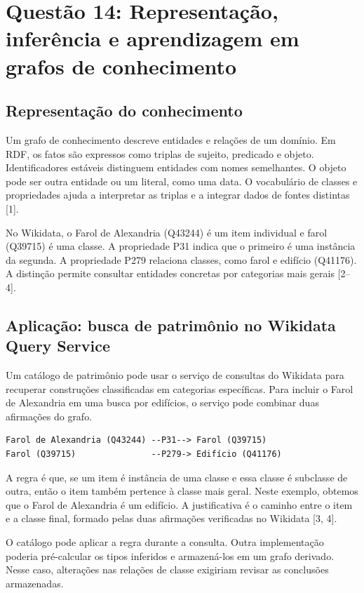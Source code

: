 \documentclass[12pt,a4paper]{article}
\begin{document}
\section{Questão 14: Representação, inferência e aprendizagem em grafos de conhecimento}

\subsection{Representação do conhecimento}

Um grafo de conhecimento descreve entidades e relações de um domínio. Em RDF, os fatos são expressos como triplas de sujeito, predicado e objeto. Identificadores estáveis distinguem entidades com nomes semelhantes. O objeto pode ser outra entidade ou um literal, como uma data. O vocabulário de classes e propriedades ajuda a interpretar as triplas e a integrar dados de fontes distintas [1].

No Wikidata, o Farol de Alexandria (Q43244) é um item individual e farol (Q39715) é uma classe. A propriedade P31 indica que o primeiro é uma instância da segunda. A propriedade P279 relaciona classes, como farol e edifício (Q41176). A distinção permite consultar entidades concretas por categorias mais gerais [2--4].

\subsection{Aplicação: busca de patrimônio no Wikidata Query Service}

Um catálogo de patrimônio pode usar o serviço de consultas do Wikidata para recuperar construções classificadas em categorias específicas. Para incluir o Farol de Alexandria em uma busca por edifícios, o serviço pode combinar duas afirmações do grafo.

\begin{lstlisting}
Farol de Alexandria (Q43244) --P31--> Farol (Q39715)
Farol (Q39715)               --P279-> Edifício (Q41176)
\end{lstlisting}

A regra é que, se um item é instância de uma classe e essa classe é subclasse de outra, então o item também pertence à classe mais geral. Neste exemplo, obtemos que o Farol de Alexandria é um edifício. A justificativa é o caminho entre o item e a classe final, formado pelas duas afirmações verificadas no Wikidata [3, 4].

O catálogo pode aplicar a regra durante a consulta. Outra implementação poderia pré-calcular os tipos inferidos e armazená-los em um grafo derivado. Nesse caso, alterações nas relações de classe exigiriam revisar as conclusões armazenadas.
\end{document}
